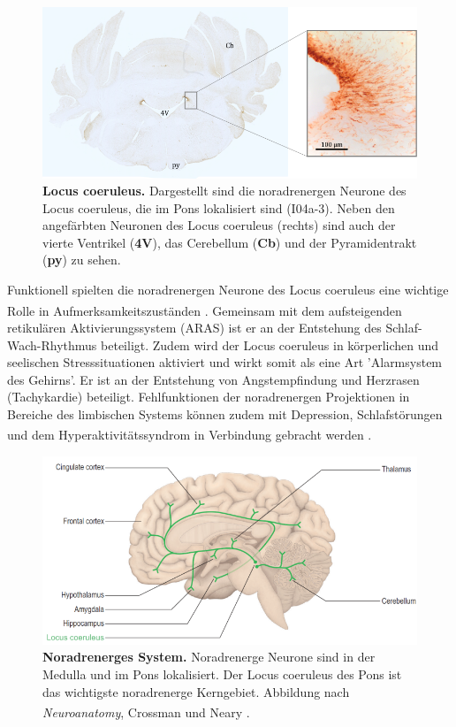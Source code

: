 \documentclass[12pt,a4paper,pdftex]{article}
\begin{document}
\begin{figure}[H]
    \centering
    \includegraphics[width=\textwidth]{pictures/Bilder_monoamine_systeme/locus_coeruleus.png}
    \caption[Locus coeruleus]{\textbf{Locus coeruleus.} Dargestellt sind die noradrenergen Neurone des Locus coeruleus, die im Pons lokalisiert sind (I04a-3). Neben den angefärbten Neuronen des Locus coeruleus (rechts) sind auch der vierte Ventrikel (\textbf{4V}), das Cerebellum (\textbf{Cb}) und der Pyramidentrakt (\textbf{py}) zu sehen.}
    \label{fig:locus_coeruleus}
\end{figure}

Funktionell spielten die noradrenergen Neurone des Locus coeruleus eine wichtige Rolle in Aufmerksamkeitszuständen \textsuperscript{\cite[46]{kandel2013principles}}. Gemeinsam mit dem aufsteigenden retikulären Aktivierungssystem (ARAS) ist er an der Entstehung des Schlaf-Wach-Rhythmus beteiligt. Zudem wird der Locus coeruleus in körperlichen und seelischen Stresssituationen aktiviert und wirkt somit als eine Art 'Alarmsystem des Gehirns'. Er ist an der Entstehung von Angstempfindung und Herzrasen (Tachykardie) beteiligt. Fehlfunktionen der noradrenergen Projektionen in Bereiche des limbischen Systems können zudem mit Depression, Schlafstörungen und dem Hyperaktivitätssyndrom in Verbindung gebracht werden \textsuperscript{\cite[6]{trepel2011neuroanatomie}}.

\begin{figure}[H]
    \centering
    \includegraphics[width=\textwidth]{pictures/Bilder_monoamine_systeme/noradrenerges_system.PNG}
    \caption[Noradrenerges System]{\textbf{Noradrenerges System.} Noradrenerge Neurone sind in der Medulla und im Pons lokalisiert. Der Locus coeruleus des Pons ist das wichtigste noradrenerge Kerngebiet. Abbildung nach \textit{Neuroanatomy}, Crossman und Neary \textsuperscript{\cite[9]{crossman2014neuroanatomy}}.}
    \label{fig:noradrenerges_system}
\end{figure}{}
\end{document}
